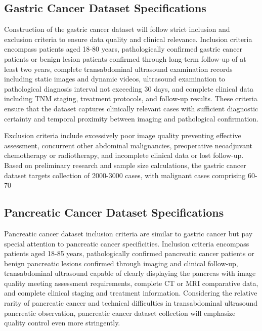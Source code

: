 \subsection{Gastric Cancer Dataset Specifications}

Construction of the gastric cancer dataset will follow strict inclusion and exclusion criteria to ensure data quality and clinical relevance. Inclusion criteria encompass patients aged 18-80 years, pathologically confirmed gastric cancer patients or benign lesion patients confirmed through long-term follow-up of at least two years, complete transabdominal ultrasound examination records including static images and dynamic videos, ultrasound examination to pathological diagnosis interval not exceeding 30 days, and complete clinical data including TNM staging, treatment protocols, and follow-up results. These criteria ensure that the dataset captures clinically relevant cases with sufficient diagnostic certainty and temporal proximity between imaging and pathological confirmation.

Exclusion criteria include excessively poor image quality preventing effective assessment, concurrent other abdominal malignancies, preoperative neoadjuvant chemotherapy or radiotherapy, and incomplete clinical data or lost follow-up. Based on preliminary research and sample size calculations, the gastric cancer dataset targets collection of 2000-3000 cases, with malignant cases comprising 60-70%

\subsection{Pancreatic Cancer Dataset Specifications}

Pancreatic cancer dataset inclusion criteria are similar to gastric cancer but pay special attention to pancreatic cancer specificities. Inclusion criteria encompass patients aged 18-85 years, pathologically confirmed pancreatic cancer patients or benign pancreatic lesions confirmed through imaging and clinical follow-up, transabdominal ultrasound capable of clearly displaying the pancreas with image quality meeting assessment requirements, complete CT or MRI comparative data, and complete clinical staging and treatment information. Considering the relative rarity of pancreatic cancer and technical difficulties in transabdominal ultrasound pancreatic observation, pancreatic cancer dataset collection will emphasize quality control even more stringently.

